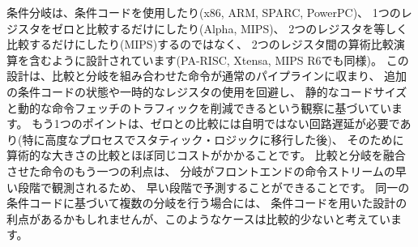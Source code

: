 \begin{commentary}
\begin{comment}
The conditional branches were designed to include arithmetic
comparison operations between two registers (as also done in PA-RISC,
Xtensa, and MIPS R6), rather than use condition codes (x86, ARM, SPARC,
PowerPC), or to only compare one register against zero (Alpha, MIPS),
or two registers only for equality (MIPS).  This design was motivated
by the observation that a combined compare-and-branch instruction fits
into a regular pipeline, avoids additional condition code state or use
of a temporary register, and reduces static code size and dynamic
instruction fetch traffic.  Another point is that comparisons against
zero require non-trivial circuit delay (especially after the move to
static logic in advanced processes) and so are almost as expensive as
arithmetic magnitude compares.  Another advantage of a fused
compare-and-branch instruction is that branches are observed earlier
in the front-end instruction stream, and so can be predicted earlier.
There is perhaps an advantage to a design with condition codes in the
case where multiple branches can be taken based on the same condition
codes, but we believe this case to be relatively rare.
\end{comment}

条件分岐は、条件コードを使用したり(x86, ARM, SPARC, PowerPC)、
1つのレジスタをゼロと比較するだけにしたり(Alpha, MIPS)、
2つのレジスタを等しく比較するだけにしたり(MIPS)するのではなく、
2つのレジスタ間の算術比較演算を含むように設計されています(PA-RISC, Xtensa, MIPS R6でも同様)。
この設計は、比較と分岐を組み合わせた命令が通常のパイプラインに収まり、
追加の条件コードの状態や一時的なレジスタの使用を回避し、
静的なコードサイズと動的な命令フェッチのトラフィックを削減できるという観察に基づいています。 
もう1つのポイントは、ゼロとの比較には自明ではない回路遅延が必要であり(特に高度なプロセスでスタティック・ロジックに移行した後)、
そのために算術的な大きさの比較とほぼ同じコストがかかることです。 
比較と分岐を融合させた命令のもう一つの利点は、
分岐がフロントエンドの命令ストリームの早い段階で観測されるため、
早い段階で予測することができることです。
同一の条件コードに基づいて複数の分岐を行う場合には、
条件コードを用いた設計の利点があるかもしれませんが、このようなケースは比較的少ないと考えています。

\begin{comment}
We considered but did not include static branch hints in the
instruction encoding.  These can reduce the pressure on dynamic
predictors, but require more instruction encoding space and
software profiling for best results, and can result in poor
performance if production runs do not match profiling runs.
\end{comment}


\end{commentary}
